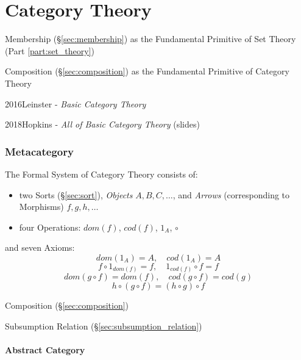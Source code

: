 \part{Category Theory}\label{part:category_theory}
\cite{awodey06}\cite{maclane69}

Membership (\S\ref{sec:membership}) as the Fundamental Primitive of
Set Theory (Part \ref{part:set_theory})

Composition (\S\ref{sec:composition}) as the Fundamental Primitive of
Category Theory

2016Leinster - \emph{Basic Category Theory}

2018Hopkins - \emph{All of Basic Category Theory} (slides)



\section{Metacategory}\label{sec:metacategory}

The Formal System of Category Theory consists of:
\begin{itemize}
\item two Sorts (\S\ref{sec:sort}), \emph{Objects} $A,B,C,\ldots$, and
  \emph{Arrows} (corresponding to Morphisms) $f,g,h,\ldots$
\item four Operations: $dom(f)$, $cod(f)$, $1_A$, $\circ$
\end{itemize}
and seven Axioms:
\[
  dom(1_A) = A,\quad cod(1_A) = A
\]\[
  f \circ 1_{dom(f)} = f, \quad 1_{cod(f)} \circ f = f
\]\[
  dom(g\circ f) = dom(f), \quad cod(g \circ f) = cod(g)
\]\[
  h \circ (g \circ f) = (h \circ g) \circ f
\]

Composition (\S\ref{sec:composition})

Subsumption Relation (\S\ref{sec:subsumption_relation})



\subsection{Abstract Category}\label{sec:abstract_category}

